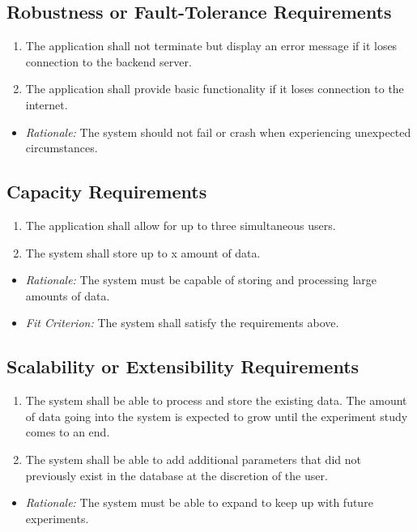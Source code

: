 \documentclass[12pt]{article}
\begin{document}
\subsection{Robustness or Fault-Tolerance Requirements}
\begin{enumerate}
  \item The application shall not terminate but display an error message if it loses connection to the backend server.
  \item The application shall provide basic functionality if it loses connection to the internet.
\end{enumerate}
\begin{itemize}
  \item \textit{Rationale:} The system should not fail or crash when experiencing unexpected circumstances.
\end{itemize}

\subsection{Capacity Requirements}
\begin{enumerate}
  \item The application shall allow for up to three simultaneous users.
  \item The system shall store up to x amount of data.
\end{enumerate}
\begin{itemize}
  \item \textit{Rationale:} The system must be capable of storing and processing large amounts of data.
  \item \textit{Fit Criterion:} The system shall satisfy the requirements above.
\end{itemize}

\subsection{Scalability or Extensibility Requirements}
\begin{enumerate}
  \item The system shall be able to process and store the existing data. The amount of data going into the system is expected to grow until the experiment study comes to an end.
  \item The system shall be able to add additional parameters that did not previously exist in the database at the discretion of the user.
\end{enumerate}
\begin{itemize}
  \item \textit{Rationale:} The system must be able to expand to keep up with future experiments.
\end{itemize}
\end{document}
